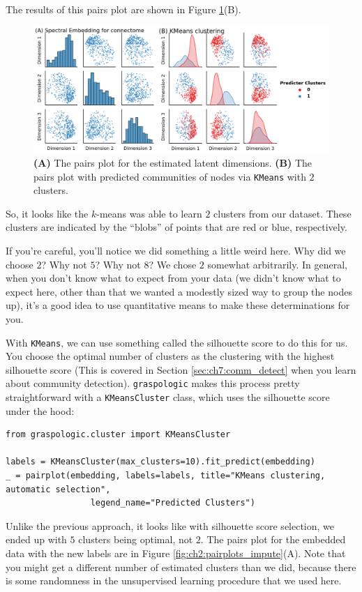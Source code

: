The results of this pairs plot are shown in Figure \ref{fig:ch2:pairplots}(B).
\begin{figure}
    \centering
    \includegraphics[width=\linewidth]{foundations/ch2/Images/pairplots.png}
    \caption[The pairs plot for embedded connectomes]{\textbf{(A)} The  pairs plot for the estimated latent dimensions. \textbf{(B)} The  pairs plot with predicted communities of nodes via \texttt{KMeans} with $2$ clusters.}
    \label{fig:ch2:pairplots}
\end{figure}
So, it looks like the $k$-means was able to learn $2$ clusters from our dataset. These clusters are indicated by the ``blobs'' of points that are red or blue, respectively.

If you're careful, you'll notice we did something a little weird here. Why did we choose $2$? Why not $5$? Why not $8$? We chose $2$ somewhat arbitrarily. In general, when you don't know what to expect from your data (we didn't know what to expect here, other than that we wanted a modestly sized way to group the nodes up), it's a good idea to use quantitative means to make these determinations for you. 

With \texttt{KMeans}, we can use something called the silhouette score to do this for us. You choose the optimal number of clusters as the clustering with the highest silhouette score (This is covered in Section \ref{sec:ch7:comm_detect} when you learn about community detection). \texttt{graspologic} makes this process pretty straightforward with a \texttt{KMeansCluster} class, which uses the silhouette score under the hood:

\begin{lstlisting}[style=python]
from graspologic.cluster import KMeansCluster

labels = KMeansCluster(max_clusters=10).fit_predict(embedding)
_ = pairplot(embedding, labels=labels, title="KMeans clustering, automatic selection", 
                 legend_name="Predicted Clusters")
\end{lstlisting}
Unlike the previous approach, it looks like with silhouette score selection, we ended up with $5$ clusters being optimal, not $2$. The pairs plot for the embedded data with the new labels are in Figure \ref{fig:ch2:pairplots_impute}(A). Note that you might get a different number of estimated clusters than we did, because there is some randomness in the unsupervised learning procedure that we used here.

